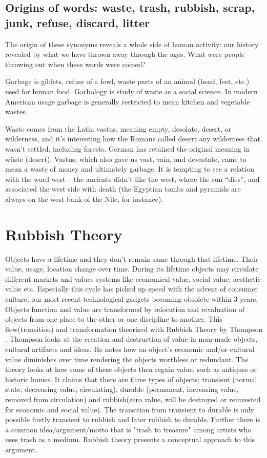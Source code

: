 \documentclass{article}
\begin{document}
\subsection{Origins of words: waste, trash, rubbish, scrap, junk, refuse, discard, litter}
The origin of these synonyms reveals a whole side of human activity: our history revealed by what we have thrown away through the ages. What were people throwing out when these words were coined? 

Garbage is giblets, refuse of a fowl, waste parts of an animal (head, feet, etc.) used for human food. Garbology is study of waste as a social science. In modern American usage garbage is generally restricted to mean kitchen and vegetable wastes.

Waste comes from the Latin vastus, meaning empty, desolate, desert, or wilderness, and it’s interesting how the Romans called desert any wilderness that wasn’t settled, including forests.  German has retained the original meaning in wüste (desert). Vastus, which also gave us vast, vain, and devastate, came to mean a waste of money and ultimately garbage.  It is tempting to see a relation with the word west – the ancients didn’t like the west, where the sun “dies”, and associated the west side with death (the Egyptian tombs and pyramids are always on the west bank of the Nile, for instance)\cite{paul2013garbage}.

\section{Rubbish Theory}
Objects have a lifetime and they don't remain same through that lifetime. Their value, usage, location change over time. During its lifetime objects may circulate different markets and values systems like economical value, social value, aesthetic value etc. Especially this cycle has picked up speed with the advent of consumer culture, our most recent technological gadgets becoming obsolete within 3 years. Objects function and value are transformed by relocation and revaluation of objects from one place to the other or one discipline to another. This flow(transition) and transformation theorized with Rubbish Theory by Thompson \cite{thompson1979rubbish}. Thompson looks at the creation and destruction of value in man-made objects, cultural artifacts and ideas. He notes how an object’s economic and/or cultural value diminishes over time rendering the objects worthless or redundant. The theory looks at how some of these objects then regain value, such as antiques or historic homes. It claims that there are three types of objects; transient (normal state, decreasing value, circulating), durable (permanent, increasing value, removed from circulation) and rubbish(zero value, will be destroyed or reinvested for economic and social value). The transition from transient to durable is only possible firstly transient to rubbish and later rubbish to durable. Further there is a common idea/argument/motto that is "trash to treasure" among artists who uses trash as a medium. Rubbish theory presents a conceptual approach to this argument. 
\end{document}
